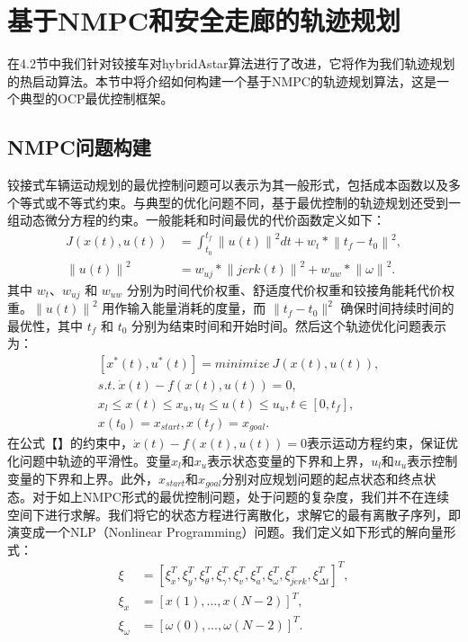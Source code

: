\documentclass[master,academic]{ysuthesis} %
\begin{document}
	\section{基于NMPC和安全走廊的轨迹规划}
	在4.2节中我们针对铰接车对hybridAstar算法进行了改进，它将作为我们轨迹规划的热启动算法。本节中将介绍如何构建一个基于NMPC的轨迹规划算法，这是一个典型的OCP最优控制框架。
		\subsection{NMPC问题构建}
		铰接式车辆运动规划的最优控制问题可以表示为其一般形式，包括成本函数以及多个等式或不等式约束。与典型的优化问题不同，基于最优控制的轨迹规划还受到一组动态微分方程的约束。一般能耗和时间最优的代价函数定义如下：
		\begin{equation}
			\begin{aligned}
				J(x(t),u(t)) &= \int_{t_0}^{t_f}
				\left\| u(t)\right\|^2dt +w_t*\left\|t_f-t_0\right\|^2,    \\
				\left\|u(t)\right\|^2&=w_{uj}*\left\|jerk(t)\right\|^2+w_{uw}*\left\|\omega\right\|^2.
			\end{aligned} 
		\end{equation}
		其中 $w_t$、$w_{uj}$ 和 $w_{uw}$ 分别为时间代价权重、舒适度代价权重和铰接角能耗代价权重。$\left\|u(t)\right\|^2$ 用作输入能量消耗的度量，而 $\|t_f- t_0\|^2$ 确保时间持续时间的最优性，其中 $t_f$ 和 $t_0$ 分别为结束时间和开始时间。然后这个轨迹优化问题表示为：
		\begin{equation}
			\begin{aligned}
				&\left[x^*(t),u^*(t)\right] = minimize\ J(x(t),u(t)),\\      
				&s.t.\ \dot x(t)-f(x(t),u(t))=0,\\
				&x_l \leq x(t) \leq x_u, u_l \leq u(t) \leq u_u,t\in \left[0,t_f\right],\\
				&x(t_0)=x_{start},x(t_f)=x_{goal}.\label{4}
			\end{aligned}   
		\end{equation}
		在公式【】的约束中，$\dot x(t)-f(x(t),u(t))=0$表示运动方程约束，保证优化问题中轨迹的平滑性。变量$x_l$和$x_u$表示状态变量的下界和上界，$u_l$和$u_u$表示控制变量的下界和上界。此外，$x_{start}$和$x_{goal}$分别对应规划问题的起点状态和终点状态。对于如上NMPC形式的最优控制问题，处于问题的复杂度，我们并不在连续空间下进行求解。我们将它的状态方程进行离散化，求解它的最有离散子序列，即演变成一个NLP（Nonlinear Programming）问题。我们定义如下形式的解向量形式：
		\begin{equation}
			\begin{aligned}
				\xi &=\left[ \xi _{x}^{T},\xi _{y}^{T},\xi _{\theta}^{T},\xi _{\gamma}^{T},\xi _{v}^{T},\xi _{a}^{T},\xi _{\omega}^{T},\xi_{{jerk}}^{T},\xi _{\Delta t}^{T} \right] ^T,\\
				\xi _x&=\left[ x\left( 1 \right) ,...,x\left( N-2 \right) \right] ^T,\\
				\xi _{\omega}&=\left[ \omega \left( 0 \right) ,...,\omega \left( N-2 \right) \right] ^T.
			\end{aligned}   
		\end{equation}
\end{document}
